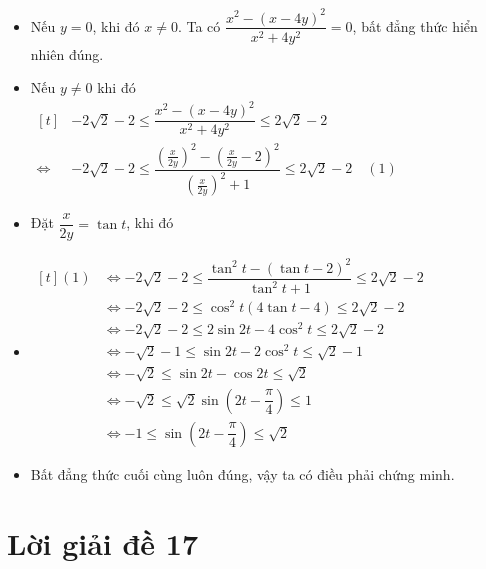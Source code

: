 \lgi 
\begin{itemize}[label=,leftmargin=*]
\item Nếu $y=0$, khi đó $x\ne 0$. Ta có $\dfrac{x^2-(x-4y)^2}{x^2+4y^2}=0$, bất đẳng thức hiển nhiên đúng.
\item Nếu $y\ne 0$ khi đó $\begin{aligned}[t] &-2\sqrt{2}-2 \le \dfrac{x^2-(x-4y)^2}{x^2+4y^2}\le 2\sqrt{2}-2 \\
\Leftrightarrow \ & -2\sqrt{2}-2 \le \dfrac{\left(\frac{x}{2y} \right)^2-\left(\frac{x}{2y}-2\right)^2}{\left(\frac{x}{2y}\right)^2+1}\le 2\sqrt{2}-2 \quad (1)\end{aligned}$
\item Đặt $\dfrac{x}{2y}=\tan t$, khi đó 
\item $\begin{aligned}[t] (1) & \Leftrightarrow -2\sqrt{2}-2 \le \dfrac{\tan ^2t-(\tan t-2)^2}{\tan ^2t+1} \le 2\sqrt{2}-2 \\
&\Leftrightarrow -2\sqrt{2}-2 \le \cos ^2t(4\tan t-4)\le 2\sqrt{2}-2 \\
& \Leftrightarrow -2\sqrt{2}-2\le 2\sin 2t-4\cos ^2t\le 2\sqrt{2}-2 \\
& \Leftrightarrow -\sqrt{2}-1 \le \sin 2t-2\cos ^2t\le \sqrt{2}-1 \\
& \Leftrightarrow -\sqrt{2}\le \sin 2t-\cos 2t\le \sqrt{2} \\
&\Leftrightarrow - \sqrt{2}\le \sqrt{2}\sin \left(2t-\dfrac{\pi}{4} \right)\le 1\\
& \Leftrightarrow -1 \le \sin \left( 2t-\dfrac{\pi}{4}\right) \le \sqrt{2} \end{aligned}$
\item Bất đẳng thức cuối cùng luôn đúng, vậy ta có điều phải chứng minh.
\end{itemize}
\section{Lời giải đề 17}

\lgi 

